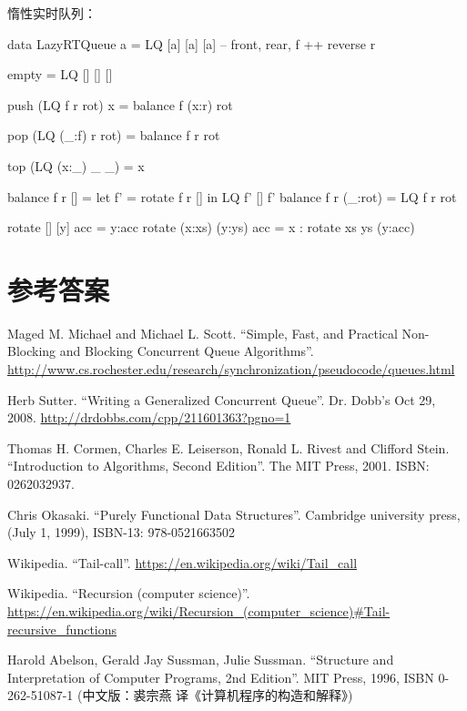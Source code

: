 \documentclass[b5paper]{ctexart}
\begin{document}
惰性实时队列：

\begin{Haskell}
data LazyRTQueue a = LQ [a] [a] [a] -- front, rear, f ++ reverse r

empty = LQ [] [] []

push (LQ f r rot) x = balance f (x:r) rot

pop (LQ (_:f) r rot) = balance f r rot

top (LQ (x:_) _ _) = x

balance f r [] = let f' = rotate f r [] in LQ f' [] f'
balance f r (_:rot) = LQ f r rot

rotate [] [y] acc = y:acc
rotate (x:xs) (y:ys) acc = x : rotate xs ys (y:acc)
\end{Haskell}

\ifx\wholebook\relax \else
\section{参考答案}
\shipoutAnswer

\begin{thebibliography}{99}

Maged M. Michael and Michael L. Scott. ``Simple, Fast, and Practical Non-Blocking and Blocking Concurrent Queue Algorithms''. \url{http://www.cs.rochester.edu/research/synchronization/pseudocode/queues.html}

Herb Sutter. ``Writing a Generalized Concurrent Queue''. Dr. Dobb's Oct 29, 2008. \url{http://drdobbs.com/cpp/211601363?pgno=1}

Thomas H. Cormen, Charles E. Leiserson, Ronald L. Rivest and Clifford Stein. ``Introduction to Algorithms, Second Edition''. The MIT Press, 2001. ISBN: 0262032937.

Chris Okasaki. ``Purely Functional Data Structures''. Cambridge university press, (July 1, 1999), ISBN-13: 978-0521663502

Wikipedia. ``Tail-call''. \url{https://en.wikipedia.org/wiki/Tail_call}

Wikipedia. ``Recursion (computer science)''. \url{https://en.wikipedia.org/wiki/Recursion_(computer_science)#Tail-recursive_functions}

Harold Abelson, Gerald Jay Sussman, Julie Sussman. ``Structure and Interpretation of Computer Programs, 2nd Edition''. MIT Press, 1996, ISBN 0-262-51087-1 (中文版：裘宗燕 译《计算机程序的构造和解释》)

\end{thebibliography}

\expandafter\enddocument
\fi
\end{document}
